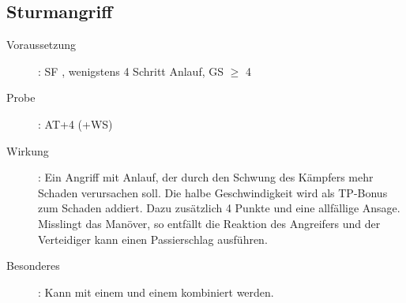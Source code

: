 \subsection{Sturmangriff}
\label{aktion.sturmangriff}
\begin{description}
    \item[Voraussetzung]:
        SF , wenigstens 4 Schritt Anlauf, GS\textrm{ ${\geq}$ 4}
    \item[Probe]:
        AT+4 (+WS)
    \item[Wirkung]:
        Ein Angriff mit Anlauf, der durch den Schwung des Kämpfers mehr Schaden verursachen soll.
        Die halbe Geschwindigkeit wird als TP-Bonus zum Schaden addiert.
        Dazu zusätzlich 4 Punkte und eine allfällige Ansage.
        Misslingt das Manöver, so entfällt die Reaktion des Angreifers und der Verteidiger kann einen Passierschlag ausführen.
    \item[Besonderes]:
        Kann mit einem  und einem  kombiniert werden.
\end{description}
